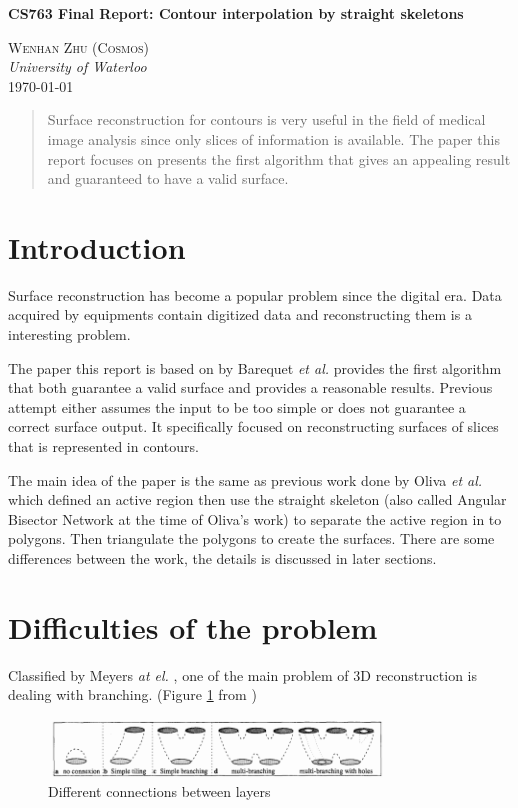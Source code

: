 \documentclass[11pt]{article}
\renewcommand{\maketitle}{
    \begin{flushright}
        {\LARGE \textbf{CS763 Final Report: Contour interpolation by straight skeletons}}


    {\large \textsc{Wenhan Zhu (Cosmos)} \\ \textit{University of Waterloo}}
    \\ \today

    \end{flushright}
}
\begin{document}
\maketitle

\begin{abstract}
    Surface reconstruction for contours is very useful in the field of medical image analysis since only slices of information is available. The paper this report focuses on presents the first algorithm that gives an appealing result and guaranteed to have a valid surface.
\end{abstract}

\section{Introduction}
Surface reconstruction has become a popular problem since the digital era. Data acquired by equipments contain digitized data and reconstructing them is a interesting problem.

The paper this report is based on by Barequet {\it et al.} \cite{barequet04} provides the first algorithm that both guarantee a valid surface and provides a reasonable results. Previous attempt either assumes the input to be too simple or does not guarantee a correct surface output. It specifically focused on reconstructing surfaces of slices that is represented in contours.

The main idea of the paper is the same as previous work done by Oliva {\it et al.} \cite{oliva96} which defined an active region then use the straight skeleton (also called Angular Bisector Network at the time of Oliva's work) to separate the active region in to polygons. Then triangulate the polygons to create the surfaces. There are some differences between the work, the details is discussed in later sections.

\section{Difficulties of the problem}
Classified by Meyers {\it at el.} \cite{meyers91}, one of the main problem of 3D reconstruction is dealing with branching. (Figure \ref{fig:branching} from \cite{oliva96})

\begin{figure}[!h]
    \centering
        \includegraphics[width=0.8\textwidth]{branching.png}
        \caption{Different connections between layers}
        \label{fig:branching}
\end{figure}
\end{document}
